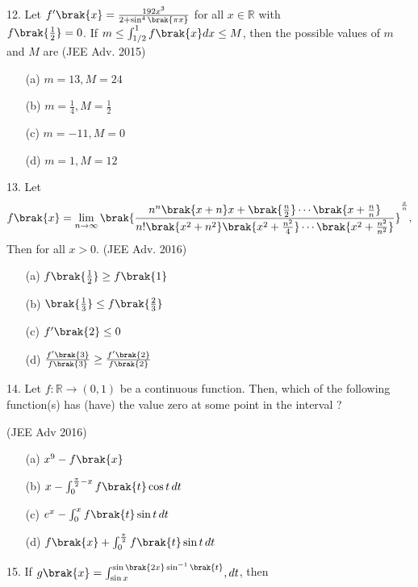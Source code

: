 \item 12. Let $f'\brak{x} = \frac{192x^3}{2 + \sin^4\brak{\pi x}}$ for all $x \in \mathbb{R}$ with \\ $f\brak{\frac{1}{2}} = 0$.
If $m \leq \int_{1/2}^{1} f\brak{x} dx \leq M$, then the possible values of $m$ and $M$ are \hfill (JEE Adv. 2015)
\begin{enumerate}
\item [(a)] $m = 13, M = 24$
\item [(b)] $m = \frac{1}{4}, M = \frac{1}{2}$
\item [(c)] $m = -11, M = 0$
\item [(d)] $m = 1, M = 12$
\end{enumerate}
\item 13. Let
\begin{align*}
f\brak{x} = \lim_{n \to \infty}  \brak{\frac{n^n \brak{x+n} x +\brak{\frac{n}{2}} \cdots \brak{x + \frac{n}{n}}}{n!\brak{ x^2 + n^2} \brak{x^2 + \frac{n^2}{4}} \cdots \brak{x^2 + \frac{n^2}{n^2}}}} ^{\frac{x}{n}},
\end{align*}
Then  for all  $x > 0$. \hfill (JEE Adv. 2016)
\begin{enumerate}
\item[(a)] $f\brak{\frac{1}{2}} \geq f\brak{1}$
\item[(b)] $\brak{\frac{1}{3} }\leq f\brak{\frac{2}{3}}$
\item [(c)] $f'\brak{2} \leq 0$
\item [(d)] $\frac{f'\brak{3}}{f\brak{3}} \geq \frac{f'\brak{2}}{f\brak{2}}$
\end{enumerate}
\item 14. Let $f: \mathbb{R} \to (0,1)$ be a continuous function. Then, which of the following function(s) has (have) the value zero at some point in the interval ?

\hfill (JEE Adv 2016)
\begin{enumerate}
\item[(a)] $x^9 - f\brak{x}$
\item[(b)] $x - \int_{0}^{\frac{\pi}{2} - x} f\brak{t} \cos t \, dt$
\item[(c)] $e^x - \int_{0}^{x} f\brak{t} \sin t \, dt$
\item[(d)] $f\brak{x} + \int_{0}^{\frac{\pi}{2}} f\brak{t} \sin t \, dt$
\end{enumerate}
\item 15. If $g\brak{x} = \int_{\sin x}^{\sin\brak{2x} \sin^{-1}\brak{t} }, dt$, then

